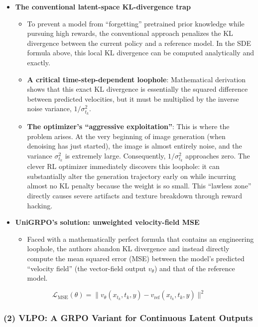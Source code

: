 \begin{itemize}
\tightlist
\item
  \textbf{The conventional latent-space KL-divergence trap}

  \begin{itemize}
  \tightlist
  \item
    To prevent a model from ``forgetting'' pretrained prior knowledge while pursuing high rewards, the conventional approach penalizes the KL divergence between the current policy and a reference model. In the SDE formula above, this local KL divergence can be computed analytically and exactly.
  \item
    \textbf{A critical time-step-dependent loophole}: Mathematical derivation shows that this exact KL divergence is essentially the squared difference between predicted velocities, but it must be multiplied by the inverse noise variance, \(1/\sigma_{t_k}^2\).
  \item
    \textbf{The optimizer's ``aggressive exploitation''}: This is where the problem arises. At the very beginning of image generation (when denoising has just started), the image is almost entirely noise, and the variance \(\sigma_{t_k}^2\) is extremely large. Consequently, \(1/\sigma_{t_k}^2\) approaches zero. The clever RL optimizer immediately discovers this loophole: it can substantially alter the generation trajectory early on while incurring almost no KL penalty because the weight is so small. This ``lawless zone'' directly causes severe artifacts and texture breakdown through reward hacking.
  \end{itemize}
\item
  \textbf{UniGRPO's solution: unweighted velocity-field MSE}

  \begin{itemize}
  \tightlist
  \item
    Faced with a mathematically perfect formula that contains an engineering loophole, the authors abandon KL divergence and instead directly compute the mean squared error (MSE) between the model's predicted ``velocity field'' (the vector-field output \(v_{\theta}\)) and that of the reference model.
  \end{itemize}
\end{itemize}

\[
\mathcal{L}_{\mathrm{MSE}}(\theta)
=\lVert v_{\theta}(x_{t_k},t_k,y)-v_{\mathrm{ref}}(x_{t_k},t_k,y)\rVert^2
\]

\hypertarget{vlpo-a-grpo-variant-for-continuous-latent-outputs}{%
\subsubsection{(2) VLPO: A GRPO Variant for Continuous Latent Outputs}\label{vlpo-a-grpo-variant-for-continuous-latent-outputs}}

